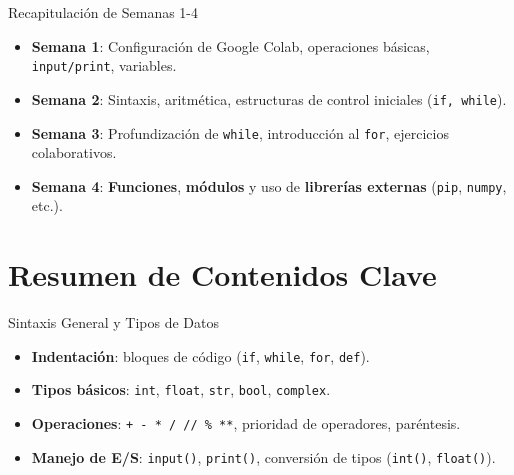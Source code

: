 \documentclass[10pt]{beamer}
\begin{document}
\begin{frame}{Recapitulación de Semanas 1-4}
  \begin{itemize}
    \item \textbf{Semana 1}: Configuración de Google Colab, operaciones básicas, \texttt{input/print}, variables.
    \item \textbf{Semana 2}: Sintaxis, aritmética, estructuras de control iniciales (\texttt{if, while}).
    \item \textbf{Semana 3}: Profundización de \texttt{while}, introducción al \texttt{for}, ejercicios colaborativos.
    \item \textbf{Semana 4}: \textbf{Funciones}, \textbf{módulos} y uso de \textbf{librerías externas} (\texttt{pip}, \texttt{numpy}, etc.).
  \end{itemize}
\end{frame}

\section{Resumen de Contenidos Clave}

\begin{frame}{Sintaxis General y Tipos de Datos}
  \begin{itemize}
    \item \textbf{Indentación}: bloques de código (\texttt{if}, \texttt{while}, \texttt{for}, \texttt{def}).
    \item \textbf{Tipos básicos}: \texttt{int}, \texttt{float}, \texttt{str}, \texttt{bool}, \texttt{complex}.
    \item \textbf{Operaciones}: \texttt{+ - * / // \% **}, prioridad de operadores, paréntesis.
    \item \textbf{Manejo de E/S}: \texttt{input()}, \texttt{print()}, conversión de tipos (\texttt{int()}, \texttt{float()}).
  \end{itemize}
\end{frame}
\end{document}

